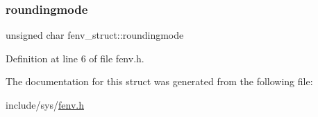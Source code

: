 \subsubsection{\texorpdfstring{roundingmode}{roundingmode}}
{\footnotesize\ttfamily unsigned char fenv\+\_\+struct\+::roundingmode}



Definition at line 6 of file fenv.\+h.



The documentation for this struct was generated from the following file\+:\begin{DoxyCompactItemize}
\item 
include/sys/\mbox{\hyperlink{sys_2fenv_8h}{fenv.\+h}}\end{DoxyCompactItemize}
